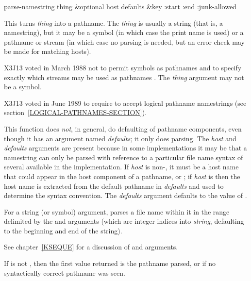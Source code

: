 \begin{defun}[Function]
parse-namestring thing &optional host defaults &key :start :end :junk-allowed

\begin{obsolete}\noindent
This turns {\it thing} into a pathname.  The {\it thing} is usually a string
(that is, a namestring), but it may be a symbol (in which case the print
name is used) or a pathname or stream
(in which case no parsing is needed, but
an error check may be made for matching hosts).
\end{obsolete}

\begin{new}
X3J13 voted in March 1988
not to permit symbols as pathnames
 and
to specify exactly which streams may be used as pathnames
.  The {\it thing} argument may not be a symbol.
\end{new}

\begin{newer}
X3J13 voted in June 1989  to require 
to accept logical pathname namestrings (see section~\ref{LOGICAL-PATHNAMES-SECTION}).
\end{newer}

This function does {\it not}, in general, do defaulting of pathname components,
even though it has an argument named {\it defaults};
it only does parsing.  The
{\it host} and {\it defaults} arguments are present because in some implementations
it may be that a namestring can only be parsed with reference to a
particular file name syntax of several available in the implementation.
If {\it host} is
non-{\nil}, it must be a host name that could appear in the
host component of a pathname, or {\nil};
if {\it host} is {\nil} then the host 
name is extracted from the default pathname in {\it defaults}
and used to determine the syntax convention.  The {\it defaults} argument
defaults to the value of .

For a string (or symbol) argument, 
parses a file name within it in the
range delimited by the  and  arguments
(which are integer indices
into {\it string}, defaulting to the beginning and end of the string).

\begin{newer}
See chapter~\ref{KSEQUE} for a discussion of  and  arguments.
\end{newer}

If  is not {\false}, then the first value
returned is the pathname parsed, or {\false} if no syntactically correct
pathname was seen.


\end{defun}
